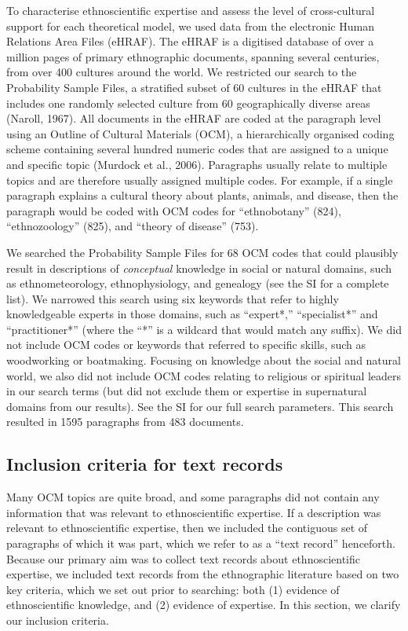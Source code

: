 \documentclass[
  11pt,
]{article}
\begin{document}
To characterise ethnoscientific expertise and assess the level of cross-cultural support for each theoretical model, we used data from the electronic Human Relations Area Files (eHRAF). The eHRAF is a digitised database of over a million pages of primary ethnographic documents, spanning several centuries, from over 400 cultures around the world. We restricted our search to the Probability Sample Files, a stratified subset of 60 cultures in the eHRAF that includes one randomly selected culture from 60 geographically diverse areas (Naroll, 1967). All documents in the eHRAF are coded at the paragraph level using an Outline of Cultural Materials (OCM), a hierarchically organised coding scheme containing several hundred numeric codes that are assigned to a unique and specific topic (Murdock et al., 2006). Paragraphs usually relate to multiple topics and are therefore usually assigned multiple codes. For example, if a single paragraph explains a cultural theory about plants, animals, and disease, then the paragraph would be coded with OCM codes for ``ethnobotany'' (824), ``ethnozoology'' (825), and ``theory of disease'' (753).

We searched the Probability Sample Files for 68 OCM codes that could plausibly result in descriptions of \emph{conceptual} knowledge in social or natural domains, such as ethnometeorology, ethnophysiology, and genealogy (see the SI for a complete list). We narrowed this search using six keywords that refer to highly knowledgeable experts in those domains, such as ``expert*,'' ``specialist*'' and ``practitioner*'' (where the ``*'' is a wildcard that would match any suffix). We did not include OCM codes or keywords that referred to specific skills, such as woodworking or boatmaking. Focusing on knowledge about the social and natural world, we also did not include OCM codes relating to religious or spiritual leaders in our search terms (but did not exclude them or expertise in supernatural domains from our results). See the SI for our full search parameters. This search resulted in 1595 paragraphs from 483 documents.

\hypertarget{inclusion-criteria-for-text-records}{%
\subsection{Inclusion criteria for text records}\label{inclusion-criteria-for-text-records}}

Many OCM topics are quite broad, and some paragraphs did not contain any information that was relevant to ethnoscientific expertise. If a description was relevant to ethnoscientific expertise, then we included the contiguous set of paragraphs of which it was part, which we refer to as a ``text record'' henceforth. Because our primary aim was to collect text records about ethnoscientific expertise, we included text records from the ethnographic literature based on two key criteria, which we set out prior to searching: both (1) evidence of ethnoscientific knowledge, and (2) evidence of expertise. In this section, we clarify our inclusion criteria.
\end{document}
